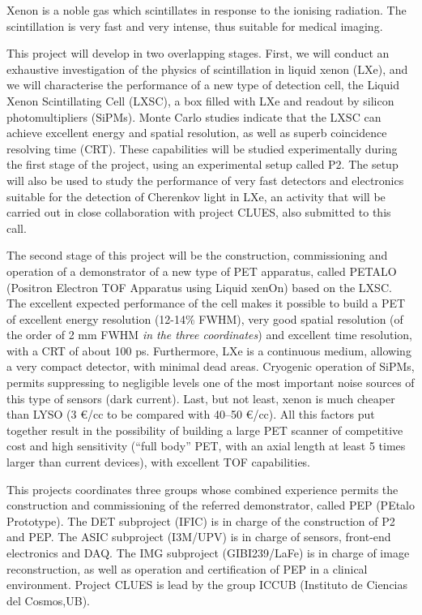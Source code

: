 Xenon is a noble gas which scintillates in response to the ionising radiation. The scintillation is very fast and very intense, thus suitable for medical imaging.

This project will develop in two overlapping stages. First, we will conduct an exhaustive investigation of the physics of scintillation in liquid xenon (LXe), and we will characterise the performance of a new type of detection cell, the Liquid Xenon Scintillating Cell (LXSC), a box filled with LXe and readout by silicon photomultipliers (SiPMs). Monte Carlo studies indicate that the LXSC can achieve excellent energy and spatial resolution, as well as superb coincidence resolving time (CRT).  These capabilities will be studied experimentally during the first stage of the project, using an experimental setup called P2. The setup will also be used to study the performance of very fast detectors and electronics suitable for the detection of Cherenkov light in LXe, an activity that will be carried out in close collaboration with project CLUES, also submitted to this call. 

The second stage of this project will be the construction, commissioning and operation of a demonstrator of a new type of PET apparatus, called
PETALO (Positron Electron TOF Apparatus using Liquid xenOn) based on the LXSC. The excellent expected performance of the cell 
makes it possible to build a PET of excellent energy resolution (12-14\% FWHM), very good spatial resolution
(of the order of 2 mm FWHM {\em in the three coordinates}) and excellent time resolution, with a CRT of about 100 ps. Furthermore, LXe is a continuous medium, allowing a very compact detector, with minimal dead areas. Cryogenic operation of SiPMs, permits suppressing to negligible levels one of the most important noise sources of this type of sensors (dark current). Last, but not least, xenon is much cheaper than LYSO (3 \euro/cc to be compared with 40--50 \euro/cc). All this factors put together result in the possibility of building a large PET scanner of competitive cost and high sensitivity (``full body'' PET, with an axial length at least 5 times larger than current devices), with excellent TOF capabilities. 

This projects coordinates three groups whose combined experience permits the construction and commissioning of the referred demonstrator, called PEP (PEtalo Prototype). The DET subproject (IFIC) is in charge of the construction of P2 and PEP. The ASIC subproject (I3M/UPV) is in charge of sensors, front-end electronics and DAQ. The IMG subproject
(GIBI239/LaFe) is in charge of image reconstruction, as well as operation and certification of PEP in a clinical environment. Project CLUES is lead by  the group ICCUB (Instituto de Ciencias del Cosmos,UB).


